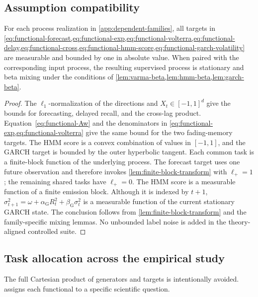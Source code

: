 \subsection{Assumption compatibility}
\label{app:functional-assumptions}

\begin{lemma}
\label{lem:functional-compatibility}
For each process realization in \cref{app:dependent-families}, all targets in
\cref{eq:functional-forecast,eq:functional-exp,eq:functional-volterra,eq:functional-delay,eq:functional-cross,eq:functional-hmm-score,eq:functional-garch-volatility}
are measurable and bounded by one in absolute value.  When paired with the
corresponding input process, the resulting supervised process is stationary and
beta mixing under the conditions of
\cref{lem:varma-beta,lem:hmm-beta,lem:garch-beta}.
\end{lemma}

\begin{proof}
The \(\ell_1\)-normalization of the directions and
\(X_t\in[-1,1]^d\) give the bounds for forecasting, delayed recall, and the
cross-lag product.  Equation~\cref{eq:functional-Aw} and the denominators in
\cref{eq:functional-exp,eq:functional-volterra} give the same bound for the two
fading-memory targets.  The HMM score is a convex combination of values in
\([-1,1]\), and the GARCH target is bounded by the outer hyperbolic tangent.
Each common task is a finite-block function of the underlying process. The
forecast target uses one future observation and therefore invokes
\cref{lem:finite-block-transform} with \(\ell_+=1\); the remaining shared tasks
have \(\ell_+=0\). The HMM score is a measurable function of a finite emission
block. Although it is indexed by \(t+1\),
\(\sigma_{t+1}^2=\omega+\alpha_{\mathrm G}R_t^2+
\beta_{\mathrm G}\sigma_t^2\) is a measurable function of the current
stationary GARCH state. The conclusion follows from
\cref{lem:finite-block-transform} and the family-specific mixing lemmas. No
unbounded label noise is added in the theory-aligned controlled suite.
\end{proof}

\subsection{Task allocation across the empirical study}
\label{app:functional-allocation}

The full Cartesian product of generators and targets is intentionally avoided.
 assigns each functional to a specific
scientific question.


